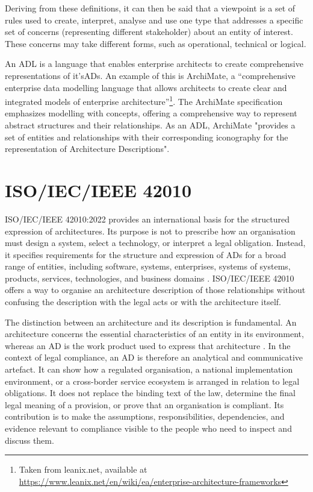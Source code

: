 Deriving from these definitions, it can then be said that a viewpoint is a set of rules used to create, interpret,  analyse and use one type that addresses a specific set of concerns (representing different stakeholder) about an entity of interest. These concerns may take different forms, such as operational, technical or logical.

An \ac{ADL} is a language that enables enterprise architects to create comprehensive representations of it's\ac{AD}s. An example of this is ArchiMate, a ``comprehensive enterprise data modelling language that allows architects to create clear and integrated models of enterprise architecture''\footnote{\label{fn:linix}Taken from leanix.net, available at \url{https://www.leanix.net/en/wiki/ea/enterprise-architecture-frameworks}}. The ArchiMate specification emphasizes modelling with concepts, offering a comprehensive way to represent abstract structures and their relationships\cite{Pbol}. As an \ac{ADL}, ArchiMate "provides a set of entities and relationships with their corresponding iconography for the representation of Architecture Descriptions"\cite{opengroup}.

\section{ISO/IEC/IEEE 42010}

ISO/IEC/IEEE 42010:2022 provides an international basis for the structured expression of architectures. Its purpose is not to prescribe how an organisation must design a system, select a technology, or interpret a legal obligation. Instead, it specifies requirements for the structure and expression of \ac{AD}s for a broad range of entities, including software, systems, enterprises, systems of systems, products, services, technologies, and business domains \cite{ISO42010:2022}. 
ISO/IEC/IEEE 42010 offers a way to organise an architecture description of those relationships without confusing the description with the legal acts or with the architecture itself.

The distinction between an architecture and its description is fundamental. An architecture concerns the essential characteristics of an entity in its environment, whereas an \ac{AD} is the work product used to express that architecture \cite{ISO42010:2022}. In the context of legal compliance, an \ac{AD} is therefore an analytical and communicative artefact. It can show how a regulated organisation, a national implementation environment, or a cross-border service ecosystem is arranged in relation to legal obligations. It does not replace the binding text of the law, determine the final legal meaning of a provision, or prove that an organisation is compliant. Its contribution is to make the assumptions, responsibilities, dependencies, and evidence relevant to compliance visible to the people who need to inspect and discuss them.

